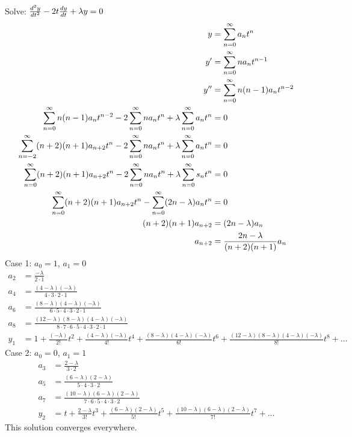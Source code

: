 \documentclass[12pt]{article}
\begin{document}
\begin{example} Solve: $\frac{d^2y}{dt^2} - 2t\frac{dy}{dt} + \lambda y = 0$ $$\begin{aligned} y &= \sum_{n = 0}^{\infty} a_nt^n \\ y' &= \sum_{n = 0}^{\infty} na_nt^{n - 1} \\ y'' &=\sum_{n = 0}^{\infty} n(n - 1)a_nt^{n - 2} \\ \sum_{n = 0}^{\infty} n(n - 1)a_nt^{n - 2} - 2\sum_{n = 0}^{\infty} na_nt^n + \lambda \sum_{n = 0}^{\infty} a_nt^n &= 0 \\ \sum_{n = -2}^{\infty} (n + 2)(n + 1)a_{n + 2}t^n - 2 \sum_{n = 0}^{\infty} na_nt^n + \lambda \sum_{n = 0}^{\infty} a_nt^n &= 0 \\ \sum_{n = 0}^{\infty} (n + 2)(n + 1)a_{n + 2}t^n - 2\sum_{n = 0}^{\infty} na_nt^n + \lambda \sum_{n = 0}^{\infty} s_nt^n &= 0 \\ \sum_{n = 0}^{\infty} (n + 2)(n + 1)a_{n + 2}t^n - \sum_{n = 0}^{\infty} (2n - \lambda) a_nt^n &= 0 \\ (n + 2)(n + 1)a_{n + 2} &= (2n - \lambda)a_n \\ a_{n + 2} &= \frac{2n - \lambda}{(n + 2)(n + 1)}a_n \end{aligned} $$ 
Case 1: $a_0 = 1$, $a_1 = 0$ $$\begin{aligned} a_2 &= \frac{-\lambda}{2 \cdot 1} \\ a_4 &= \frac{(4 - \lambda)(-\lambda)}{4 \cdot 3 \cdot 2 \cdot 1} \\ a_6 &= \frac{(8 - \lambda)(4 - \lambda)(-\lambda)}{6 \cdot 5 \cdot 4 \cdot 3 \cdot 2 \cdot 1} \\ a_8 &= \frac{(12- \lambda)(8 - \lambda)(4 - \lambda)(-\lambda)}{8 \cdot 7 \cdot 6 \cdot 5 \cdot4 \cdot 3 \cdot 2 \cdot 1} \\ y_1 &= 1 + \frac{(-\lambda)}{2!}t^2 + \frac{(4 - \lambda)(-\lambda)}{4!}t^4 + \frac{(8 - \lambda)(4 - \lambda)(-\lambda)}{6!}t^6 + \frac{(12 - \lambda)(8 - \lambda)(4 - \lambda)(-\lambda)}{8!}t^8 + \dots \end{aligned} $$ Case 2: $a_0 = 0$, $a_1 = 1$ $$\begin{aligned} a_3 &= \frac{2 - \lambda}{3 \cdot 2} \\ a_5 &= \frac{(6 - \lambda)(2 - \lambda)}{5 \cdot 4 \cdot 3 \cdot 2} \\ a_7 &= \frac{(10 - \lambda)(6  -\lambda)(2 - \lambda)}{7 \cdot 6 \cdot 5 \cdot 4 \cdot 3 \cdot 2} \\ y_2 &= t + \frac{2 - \lambda}{3!}t^3 + \frac{(6 - \lambda)(2 - \lambda)}{5!}t^5 + \frac{(10 - \lambda)(6 - \lambda)(2 - \lambda)}{7!}t^7 + \dots \end{aligned} $$ This solution converges  everywhere. \end{example} 
\end{document}
